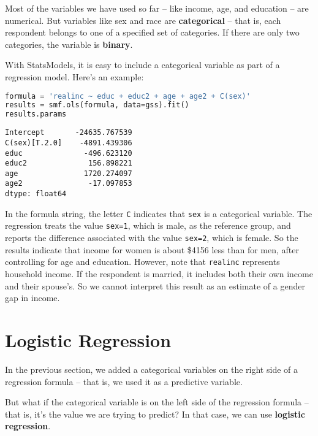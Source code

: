 Most of the variables we have used so far -- like income, age, and
education -- are numerical. But variables like sex and race are
\textbf{categorical} -- that is, each respondent belongs to one of a
specified set of categories. If there are only two categories, the
variable is \textbf{binary}.

With StatsModels, it is easy to include a categorical variable as part
of a regression model. Here's an example:

\begin{lstlisting}[language=Python,style=source]
formula = 'realinc ~ educ + educ2 + age + age2 + C(sex)'
results = smf.ols(formula, data=gss).fit()
results.params
\end{lstlisting}

\begin{lstlisting}[style=output]
Intercept       -24635.767539
C(sex)[T.2.0]    -4891.439306
educ              -496.623120
educ2              156.898221
age               1720.274097
age2               -17.097853
dtype: float64
\end{lstlisting}

In the formula string, the letter \passthrough{\lstinline!C!} indicates
that \passthrough{\lstinline!sex!} is a categorical variable. The
regression treats the value \passthrough{\lstinline!sex=1!}, which is
male, as the reference group, and reports the difference associated with
the value \passthrough{\lstinline!sex=2!}, which is female. So the
results indicate that income for women is about \$4156 less than for
men, after controlling for age and education. However, note that
\passthrough{\lstinline!realinc!} represents household income. If the
respondent is married, it includes both their own income and their
spouse's. So we cannot interpret this result as an estimate of a gender
gap in income.

\hypertarget{logistic-regression}{%
\section{Logistic Regression}\label{logistic-regression}}

In the previous section, we added a categorical variables on the right
side of a regression formula -- that is, we used it as a predictive
variable.

But what if the categorical variable is on the left side of the
regression formula -- that is, it's the value we are trying to predict?
In that case, we can use \textbf{logistic regression}.

